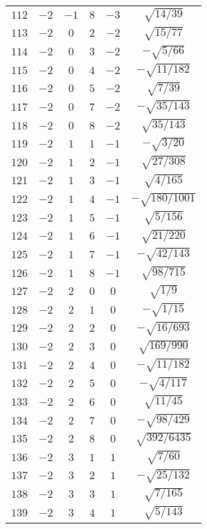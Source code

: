 \begin{table}
\begin{center}
\begin{tabular}{|c|c|c|c|c|c|}
$112$ & $-2$ & $-1$ & $8$ & $-3$ & $\sqrt{14/39}$ \\ 
$113$ & $-2$ & $0$ & $2$ & $-2$ & $\sqrt{15/77}$ \\ 
$114$ & $-2$ & $0$ & $3$ & $-2$ & $-\sqrt{5/66}$ \\ 
$115$ & $-2$ & $0$ & $4$ & $-2$ & $-\sqrt{11/182}$ \\ 
$116$ & $-2$ & $0$ & $5$ & $-2$ & $\sqrt{7/39}$ \\ 
$117$ & $-2$ & $0$ & $7$ & $-2$ & $-\sqrt{35/143}$ \\ 
$118$ & $-2$ & $0$ & $8$ & $-2$ & $\sqrt{35/143}$ \\ 
$119$ & $-2$ & $1$ & $1$ & $-1$ & $-\sqrt{3/20}$ \\ 
$120$ & $-2$ & $1$ & $2$ & $-1$ & $\sqrt{27/308}$ \\ 
$121$ & $-2$ & $1$ & $3$ & $-1$ & $\sqrt{4/165}$ \\ 
$122$ & $-2$ & $1$ & $4$ & $-1$ & $-\sqrt{180/1001}$ \\ 
$123$ & $-2$ & $1$ & $5$ & $-1$ & $\sqrt{5/156}$ \\ 
$124$ & $-2$ & $1$ & $6$ & $-1$ & $\sqrt{21/220}$ \\ 
$125$ & $-2$ & $1$ & $7$ & $-1$ & $-\sqrt{42/143}$ \\ 
$126$ & $-2$ & $1$ & $8$ & $-1$ & $\sqrt{98/715}$ \\ 
$127$ & $-2$ & $2$ & $0$ & $0$ & $\sqrt{1/9}$ \\ 
$128$ & $-2$ & $2$ & $1$ & $0$ & $-\sqrt{1/15}$ \\ 
$129$ & $-2$ & $2$ & $2$ & $0$ & $-\sqrt{16/693}$ \\ 
$130$ & $-2$ & $2$ & $3$ & $0$ & $\sqrt{169/990}$ \\ 
$131$ & $-2$ & $2$ & $4$ & $0$ & $-\sqrt{11/182}$ \\ 
$132$ & $-2$ & $2$ & $5$ & $0$ & $-\sqrt{4/117}$ \\ 
$133$ & $-2$ & $2$ & $6$ & $0$ & $\sqrt{11/45}$ \\ 
$134$ & $-2$ & $2$ & $7$ & $0$ & $-\sqrt{98/429}$ \\ 
$135$ & $-2$ & $2$ & $8$ & $0$ & $\sqrt{392/6435}$ \\ 
$136$ & $-2$ & $3$ & $1$ & $1$ & $\sqrt{7/60}$ \\ 
$137$ & $-2$ & $3$ & $2$ & $1$ & $-\sqrt{25/132}$ \\ 
$138$ & $-2$ & $3$ & $3$ & $1$ & $\sqrt{7/165}$ \\ 
$139$ & $-2$ & $3$ & $4$ & $1$ & $\sqrt{5/143}$ \\ 

\end{tabular}
\end{center}
\end{table}
